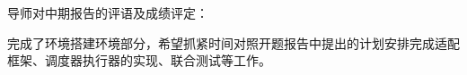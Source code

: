 
{
    \bfseries

    {
        \noindent 导师对中期报告的评语及成绩评定：
    }
}

完成了环境搭建环境部分，希望抓紧时间对照开题报告中提出的计划安排完成适配框架、调度器执行器的实现、联合测试等工作。

{
    \bfseries
    \mbox{} \vfill
    \designmidcheckeval[7]
    \signature{指导教师（签名）}
}
